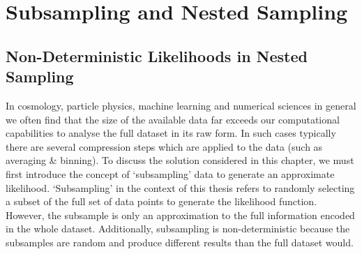 
\chapter{Subsampling and Nested Sampling}\label{ch:chapter3}

\ifpdf
    \graphicspath{{Chapter3/Figs/Raster/}{Chapter3/Figs/PDF/}{Chapter3/Figs/}}
\else
    \graphicspath{{Chapter3/Figs/Vector/}{Chapter3/Figs/}}
\fi

\section{Non-Deterministic Likelihoods in Nested Sampling}

In cosmology, particle physics, machine learning and numerical sciences in general we often find that the size of the available data far exceeds our computational capabilities to  analyse the full dataset in its raw form. In such cases typically there are several compression steps which are applied to the data (such as averaging \& binning). To discuss the solution considered in this chapter, we must first introduce the concept of `subsampling' data to generate an approximate likelihood. `Subsampling' in the context of this thesis refers to randomly selecting a subset of the full set of data points to generate the likelihood function. However, the subsample is only an approximation to the full information encoded in the whole dataset. Additionally, subsampling is non-deterministic because the subsamples are random and produce different results than the full dataset would. 

